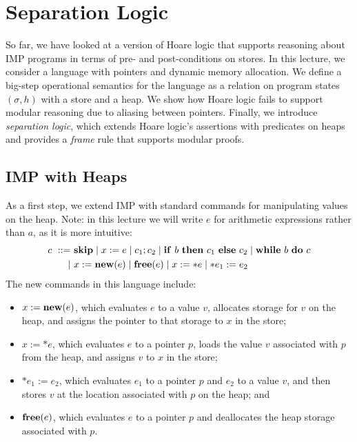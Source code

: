 % 
\chapter{Separation Logic}

So far, we have looked at a version of Hoare logic that supports reasoning about IMP programs in
terms of pre- and post-conditions on stores. In this lecture, we consider a language with pointers
and dynamic memory allocation. We define a big-step operational semantics for the language as a
relation on program states $(\sigma,h)$ with a store and a heap. We show how Hoare logic fails to
support modular reasoning due to aliasing between pointers. Finally, we introduce
\emph{separation logic}, which extends Hoare logic's assertions with predicates on heaps and
provides a \emph{frame} rule that supports modular proofs.

\section{IMP with Heaps}
%
As a first step, we extend IMP with standard commands for manipulating values on the heap. Note: in
this lecture we will write $e$ for arithmetic expressions rather than $a$, as it is more intuitive:
\begin{align*}
  c\ ::=\ & \kw{skip}\mid x:=e\mid c_1;c_2\mid\kw{if}\ b\ \kw{then}\ c_1\ \kw{else}\ c_2\mid\kw{while}\ b\ \kw{do}\ c\\
  \mid\ & x:=\kw{new}(e)\mid\kw{free}(e)\mid x:=\ast e\mid\ast e_1:=e_2
\end{align*}
The new commands in this language include:
\begin{itemize}
  \item $x:=\mathbf{new}(e)$, which evaluates $e$ to a value $v$, allocates storage for $v$ on the heap,
    and assigns the pointer to that storage to $x$ in the store;
  \item $x:=\ast e$, which evaluates $e$ to a pointer $p$, loads the value $v$ associated with $p$
    from the heap, and assigns $v$ to $x$ in the store;
  \item $\ast e_1:=e_2$, which evaluates $e_1$ to a pointer $p$ and $e_2$ to a value $v$, and then
    stores $v$ at the location associated with $p$ on the heap; and
  \item $\mathbf{free}(e)$, which evaluates $e$ to a pointer $p$ and deallocates the heap storage
    associated with $p$.
\end{itemize}
%
